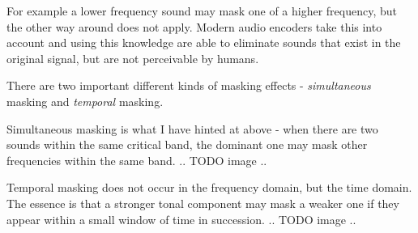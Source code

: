 For example a lower frequency sound may mask one of a higher frequency, but the other way around does not apply. \cite{gelfand1990hearing} Modern audio encoders take this into account and using this knowledge are able to eliminate sounds that exist in the original signal, but are not perceivable by humans.

There are two important different kinds of masking effects - \emph{simultaneous} masking and \emph{temporal} masking. \cite{Raissi2002TheTB}

Simultaneous masking is what I have hinted at above - when there are two sounds within the same critical band, the dominant one may mask other frequencies within the same band.
.. TODO image ..

Temporal masking does not occur in the frequency domain, but the time domain. The essence is that a stronger tonal component may mask a weaker one if they appear within a small window of time in succession.
.. TODO image  ..





